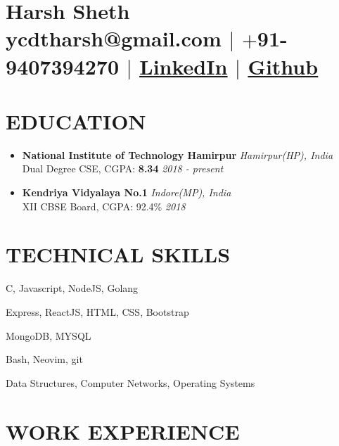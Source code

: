 \documentclass[12pt]{article}
\begin{document}
\section{Harsh Sheth\\ \normalfont ycdtharsh@gmail.com $|$ \normalfont $+$91-9407394270 $|$  \underline{\href{https://www.linkedin.com/in/harsh-sheth-2101}{LinkedIn}} $|$ \underline{\href{https://github.com/harsh-sheth}{Github}}}

\section{EDUCATION}
\begin{itemize}
  \item{
      \textbf{National Institute of Technology Hamirpur} \hfill \textit{Hamirpur(HP), India}\\
      Dual Degree CSE, CGPA: \textbf{8.34} \hfill \textit{2018 - present}
  } 
  \item{
      \textbf{Kendriya Vidyalaya No.1} \hfill \textit{Indore(MP), India}\\
      XII CBSE Board, CGPA: 92.4\% \hfill \textit{2018}
  }
\end{itemize}

\section{TECHNICAL SKILLS}
\begin{description}
  \setlength{\itemindent}{\parindent}
  \setlength{\itemsep}{0em}
  \item[Languages:]{C, Javascript, NodeJS, Golang}
  \item[Web Technologies:]{Express, ReactJS, HTML, CSS, Bootstrap}
  \item[Databases:]{MongoDB, MYSQL}
  \item[Tools:]{Bash, Neovim, git}
  \item[Coursework:]{Data Structures, Computer Networks, Operating Systems}
\end{description}

\section{WORK EXPERIENCE}
\end{document}
